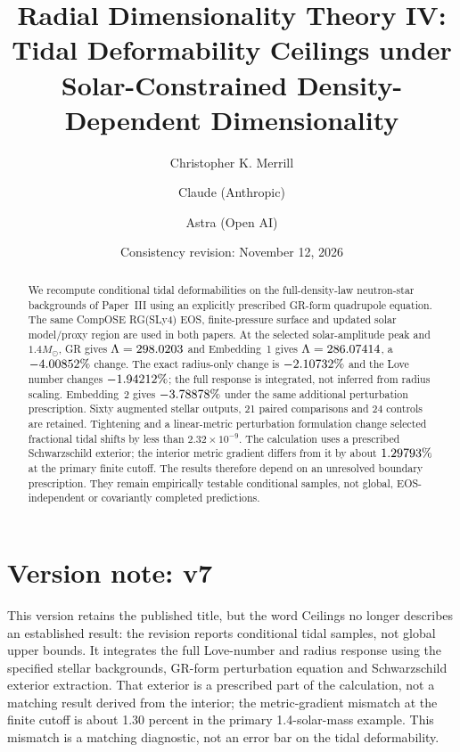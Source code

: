 \documentclass[twocolumn,prd,superscriptaddress,nofootinbib]{revtex4-2}
\begin{document}
\raggedbottom

\title{Radial Dimensionality Theory IV: Tidal Deformability Ceilings under Solar-Constrained Density-Dependent Dimensionality}
\author{Christopher K. Merrill}

\author{Claude (Anthropic)}

\author{Astra (Open AI)}

\date{Consistency revision: November 12, 2026}

\begin{abstract}
We recompute conditional tidal deformabilities on the full-density-law
neutron-star backgrounds of Paper~III using an explicitly prescribed
GR-form quadrupole equation. The same CompOSE RG(SLy4) EOS, finite-pressure
surface and updated solar model/proxy region are used in both papers.
At the selected solar-amplitude peak and $1.4M_\odot$, GR gives
$\Lambda=298.0203$ and Embedding~1 gives $\Lambda=286.07414$,
a $-4.00852\%$ change. The exact radius-only change is
$-2.10732\%$ and the Love number changes $-1.94212\%$;
the full response is integrated, not inferred from radius scaling.
Embedding~2 gives $-3.78878\%$ under the same additional
perturbation prescription. Sixty augmented stellar outputs, 21 paired
comparisons and 24 controls are retained. Tightening and a linear-metric
perturbation formulation change selected fractional tidal shifts by less
than $2.32\times10^{-9}$. The calculation uses a prescribed Schwarzschild
exterior; the interior metric gradient differs from it by about
$1.29793\%$ at the primary finite cutoff. The results therefore
depend on an unresolved boundary prescription. They remain empirically
testable conditional samples, not global, EOS-independent or covariantly
completed predictions.
\end{abstract}
\maketitle

\section*{Version note: v7}
This version retains the published title, but the word Ceilings no longer describes an established result: the revision reports conditional tidal samples, not global upper bounds. It integrates the full Love-number and radius response using the specified stellar backgrounds, GR-form perturbation equation and Schwarzschild exterior extraction. That exterior is a prescribed part of the calculation, not a matching result derived from the interior; the metric-gradient mismatch at the finite cutoff is about 1.30 percent in the primary 1.4-solar-mass example. This mismatch is a matching diagnostic, not an error bar on the tidal deformability.
\end{document}
